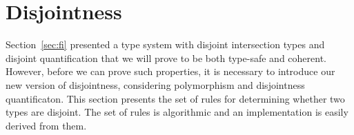 \section{Disjointness} \label{sec:alg-dis}

Section~\ref{sec:fi} presented a type system with disjoint
intersection types and disjoint quantification that we will prove to be
both type-safe and coherent. 
However, before we can prove such properties, it is necessary to introduce our
new version of disjointness, considering polymorphism and disjointness quantificaton.
This section presents the set of rules for determining whether two types are disjoint. 
The set of rules is algorithmic and an implementation is easily derived from them. 

